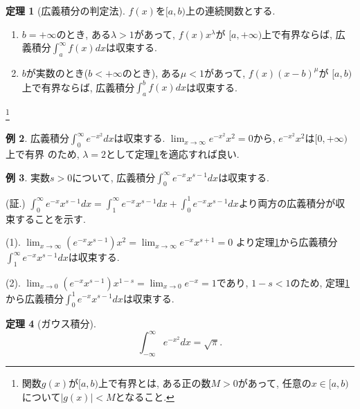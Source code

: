 \documentclass[dvipdfmx,a4paper,11pt]{article}
\theoremstyle{definition}
\newtheorem{thm}{定理}
\newtheorem{exa}[thm]{例}
\begin{document}
  \begin{tcolorbox}[
    colback = white,
    colframe = green!35!black,
    fonttitle = \bfseries,
    breakable = true]
    \begin{thm}[広義積分の判定法]
    \label{kougi}
$f(x)$を$[a,b)$上の連続関数とする.
\begin{enumerate}
\item $b=+ \infty$のとき, ある$\lambda >1$があって, $f(x)x^{\lambda}$が
$[a, +\infty)$上で有界ならば, 広義積分$\int_{a}^{\infty} f(x)dx $は収束する.
\item $b$が実数のとき($b <+ \infty$のとき), ある$\mu <1$があって, $f(x)(x-b)^{\mu}$が
$[a, b)$上で有界ならば, 広義積分$\int_{a}^{b} f(x)dx $は収束する.
\end{enumerate}
 \end{thm}
 \end{tcolorbox}
 \footnote{関数$g(x)$が$[a, b)$上で有界とは, ある正の数$M>0$があって, 任意の$x \in [a, b)$について$|g(x)| < M$となること.}
 
\begin{exa}
広義積分$\int_{0}^{\infty} e^{-x^2}dx $は収束する.
$\lim_{x \rightarrow \infty}e^{-x^2}x^{2} =0$から, $e^{-x^2}x^{2} $は$[0, +\infty)$上で有界
のため, $\lambda=2$として定理\ref{kougi}を適応すれば良い.

 \end{exa}
  \begin{exa}
実数$s>0$について, 広義積分$\int_{0}^{\infty} e^{-x}x^{s-1}dx $は収束する.

\hspace{-18pt}(証.)
$\int_{0}^{\infty} e^{-x}x^{s-1}dx = \int_{1}^{\infty} e^{-x}x^{s-1}dx+\int_{0}^{1} e^{-x}x^{s-1}dx$より両方の広義積分が収束することを示す.

\hspace{-18pt}(1). $\lim_{x \rightarrow \infty} (e^{-x}x^{s-1}) x^{2} = \lim_{x \rightarrow \infty} e^{-x}x^{s+1} =0$
より定理\ref{kougi}から広義積分$\int_{1}^{\infty} e^{-x}x^{s-1}dx$は収束する.

\hspace{-18pt}(2). $\lim_{x \rightarrow 0} (e^{-x}x^{s-1}) x^{1-s} =\lim_{x \rightarrow 0} e^{-x} =1$であり, $1-s<1$のため, 定理\ref{kougi}から広義積分$\int_{0}^{1} e^{-x}x^{s-1} dx$は収束する.
 \end{exa}

 \begin{tcolorbox}[
    colback = white,
    colframe = green!35!black,
    fonttitle = \bfseries,
    breakable = true]
    \begin{thm}[ガウス積分]
  $$
  \int_{-\infty}^{\infty} e^{-x^2}dx = \sqrt{\pi}.
  $$
    
 \end{thm}
 \end{tcolorbox}
 
\end{document}
